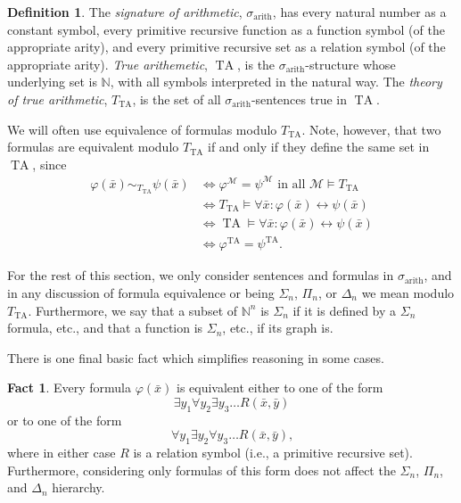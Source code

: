 \documentclass{article}
\theoremstyle{plain}
\theoremstyle{definition}
\newtheorem{defn}[thm]{Definition}
\newtheorem{fact}[thm]{Fact}
\newcommand{\defterm}{\emph}
\newcommand{\arithsig}{\sigma_{\operatorname{arith}}}
\newcommand{\tuple}{\bar}
\DeclareMathOperator{\TA}{TA}
\newcommand{\tathy}{T_{\TA}}
\renewcommand{\phi}{\varphi}
\begin{document}
\begin{defn}
  The \defterm{signature of arithmetic}, $\arithsig$, has every
  natural number as a constant symbol, every primitive recursive
  function as a function symbol (of the appropriate arity), and every
  primitive recursive set as a relation symbol (of the appropriate
  arity). \defterm{True arithemetic}, $\TA$, is the
  $\arithsig$-structure whose underlying set is $\mathbb{N}$, with all
  symbols interpreted in the natural way. The \defterm{theory of true
    arithmetic}, $\tathy$, is the set of all $\arithsig$-sentences
  true in $\TA$.
\end{defn}

We will often use equivalence of formulas modulo $\tathy$. Note,
however, that two formulas are equivalent modulo $\tathy$ if and only
if they define the same set in $\TA$, since
\begin{align*}
  \phi(\tuple{x}) \sim_{\tathy} \psi(\tuple{x})
  &\iff \phi^\mathcal{M} = \psi^\mathcal{M} \text{ in all } \mathcal{M} \models \tathy \\
  &\iff \tathy \models \forall \tuple{x}: \phi(\tuple{x}) \leftrightarrow \psi(\tuple{x}) \\
  &\iff \TA \models \forall \tuple{x}: \phi(\tuple{x}) \leftrightarrow \psi(\tuple{x}) \\
  &\iff \phi^{\TA} = \psi^{\TA} \text{.}
\end{align*}

For the rest of this section, we only consider sentences and formulas
in $\arithsig$, and in any discussion of formula equivalence or being
$\Sigma_n$, $\Pi_n$, or $\Delta_n$ we mean modulo
$\tathy$. Furthermore, we say that a subset of $\mathbb{N}^n$ is
$\Sigma_n$ if it is defined by a $\Sigma_n$ formula, etc., and that a
function is $\Sigma_n$, etc., if its graph is.

There is one final basic fact which simplifies reasoning in some
cases.

\begin{fact}\label{fact:arith-simpler-normalform}
  Every formula $\phi(\tuple{x})$ is equivalent either to one of the
  form
  $$\exists y_1 \forall y_2 \exists y_3 \ldots R(\tuple{x},\tuple{y})$$
  or to one of the form
  $$\forall y_1 \exists y_2 \forall y_3 \ldots R(\tuple{x},\tuple{y})\text{,}$$
  where in either case $R$ is a relation symbol (i.e., a primitive
  recursive set). Furthermore, considering only formulas of this form
  does not affect the $\Sigma_n$, $\Pi_n$, and $\Delta_n$ hierarchy.
\end{fact}
\end{document}
